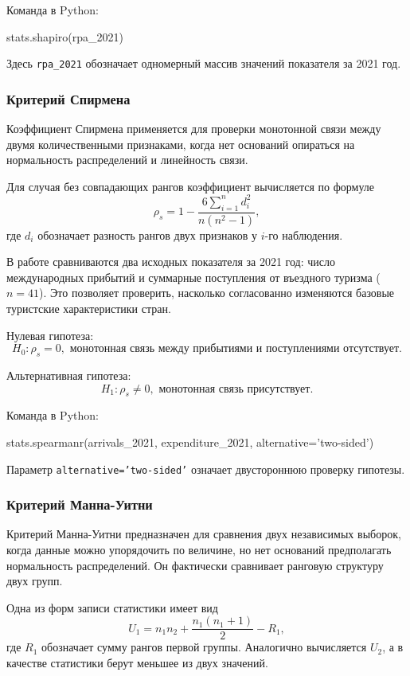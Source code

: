 \documentclass[14pt,a4paper]{extarticle}
\newcommand{\pycmd}[1]{%
  \begin{tcolorbox}[enhanced,breakable,colback=white,colframe=black,boxrule=0.5pt,left=5pt,right=5pt,top=5pt,bottom=5pt,arc=0pt]
  {\ttfamily\small #1}
  \end{tcolorbox}%
}
\begin{document}
Команда в Python:
\pycmd{stats.shapiro(rpa\_2021)}
Здесь \texttt{rpa\_2021} обозначает одномерный массив значений показателя за 2021 год.

\subsubsection{Критерий Спирмена}

Коэффициент Спирмена применяется для проверки монотонной связи между двумя количественными признаками, когда нет оснований опираться на нормальность распределений и линейность связи.

Для случая без совпадающих рангов коэффициент вычисляется по формуле
\begin{equation}
\rho_s = 1 - \frac{6\sum\limits_{i=1}^{n} d_i^2}{n(n^2-1)},
\end{equation}
где $d_i$ обозначает разность рангов двух признаков у $i$-го наблюдения.

В работе сравниваются два исходных показателя за 2021 год: число международных прибытий и суммарные поступления от въездного туризма ($n=41$). Это позволяет проверить, насколько согласованно изменяются базовые туристские характеристики стран.

\par\indent Нулевая гипотеза:
\begin{equation*}
H_0: \rho_s = 0, \text{ монотонная связь между прибытиями и поступлениями отсутствует.}
\end{equation*}
\par\indent Альтернативная гипотеза:
\begin{equation*}
H_1: \rho_s \neq 0, \text{ монотонная связь присутствует.}
\end{equation*}

Команда в Python:
\pycmd{stats.spearmanr(arrivals\_2021, expenditure\_2021, alternative='two-sided')}
Параметр \texttt{alternative='two-sided'} означает двустороннюю проверку гипотезы.

\subsubsection{Критерий Манна-Уитни}

Критерий Манна-Уитни предназначен для сравнения двух независимых выборок, когда данные можно упорядочить по величине, но нет оснований предполагать нормальность распределений. Он фактически сравнивает ранговую структуру двух групп.

Одна из форм записи статистики имеет вид
\begin{equation}
U_1 = n_1n_2 + \frac{n_1(n_1+1)}{2} - R_1,
\end{equation}
где $R_1$ обозначает сумму рангов первой группы. Аналогично вычисляется $U_2$, а в качестве статистики берут меньшее из двух значений.
\end{document}
